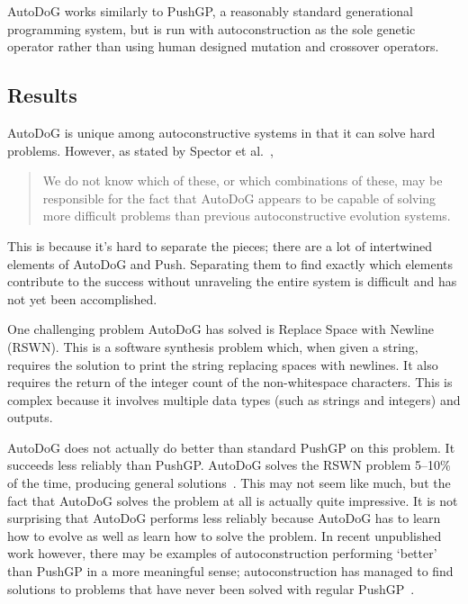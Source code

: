 \documentclass{sig-alternate}
\begin{document}
AutoDoG works similarly to PushGP, a reasonably standard generational programming system, but is run with autoconstruction as the sole genetic operator rather than using human designed mutation and crossover operators.

\subsection{Results}
\label{sec:results}
AutoDoG is unique among autoconstructive systems in that it can solve hard problems. However, as stated by Spector et al.~\cite{spector:2016},
\begin{quotation}
	We do not know which of these, or which combinations of these, may be responsible for the fact that AutoDoG appears to be capable of solving more difficult problems than previous autoconstructive evolution systems.
\end{quotation}
This is because it's hard to separate the pieces; there are a lot of intertwined elements of AutoDoG and Push. Separating them to find exactly which elements contribute to the success without unraveling the entire system is difficult and has not yet been accomplished.

One challenging problem AutoDoG has solved is Replace Space with Newline (RSWN). This is a software synthesis problem which, when given a string, requires the solution to print the string replacing spaces with newlines. It also requires the return of the integer count of the non-whitespace characters. This is complex because it involves multiple data types (such as strings and integers) and outputs.

AutoDoG does not actually do better than standard PushGP on this problem. It succeeds less reliably than PushGP. AutoDoG solves the RSWN problem 5--10\% of the time, producing general solutions~\cite{spector:2016}. This may not seem like much, but the fact that AutoDoG solves the problem at all is actually quite impressive. It is not surprising that AutoDoG performs less reliably because AutoDoG has to learn how to evolve as well as learn how to solve the problem. In recent unpublished work however, there may be examples of autoconstruction performing `better' than PushGP in a more meaningful sense; autoconstruction has managed to find solutions to problems that have never been solved with regular PushGP~\cite{eva:2017}.

\end{document}
